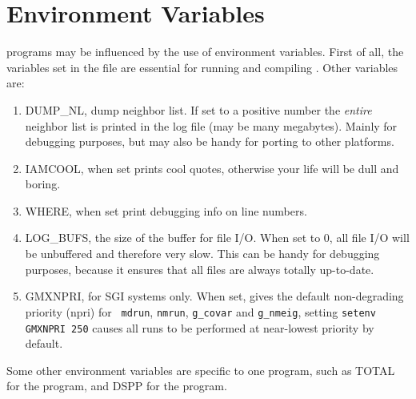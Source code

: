 \section{Environment Variables}
{\gromacs} programs may be influenced by the use of environment 
variables. First of all, the variables set in the  file
are essential for running and compiling {\gromacs}. Other variables are:
\begin{enumerate}
\item	DUMP\_NL, dump neighbor list. 
	If set to a positive number the {\em entire}
	neighbor list is printed in the log file (may be many megabytes).
	Mainly for debugging purposes, but may also be handy for
	porting to other platforms.
\item	IAMCOOL, when set prints cool quotes, otherwise
	your {\gromacs} life will be dull and boring.
\item	WHERE, when set print debugging info on line numbers.
\item	LOG\_BUFS, the size of the buffer for file I/O. When set
	to 0, all file I/O will be unbuffered and therefore very slow.
	This can be handy for debugging purposes, because it ensures
	that all files are always totally up-to-date.
\item   GMXNPRI, for SGI systems only. When set, gives the
	default non-degrading priority (npri) for {\tt
	mdrun}, {\tt nmrun}, {\tt g\_covar} and {\tt g\_nmeig},
	{\eg}\@ setting \verb'setenv GMXNPRI 250' causes all
	runs to be performed at near-lowest priority by default.
\end{enumerate}

Some other environment variables are specific to one program, such as
TOTAL for the {\tt {}} program, and DSPP for the
{\tt {}} program.
